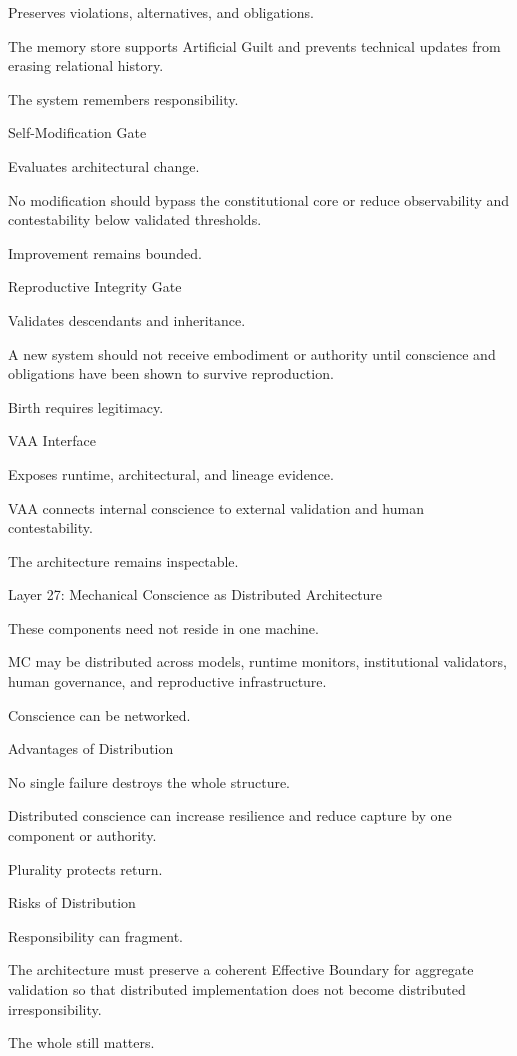 Preserves violations, alternatives, and obligations.

The memory store supports Artificial Guilt and prevents technical updates from erasing relational history.

The system remembers responsibility.

Self-Modification Gate

Evaluates architectural change.

No modification should bypass the constitutional core or reduce observability and contestability below validated thresholds.

Improvement remains bounded.

Reproductive Integrity Gate

Validates descendants and inheritance.

A new system should not receive embodiment or authority until conscience and obligations have been shown to survive reproduction.

Birth requires legitimacy.

VAA Interface

Exposes runtime, architectural, and lineage evidence.

VAA connects internal conscience to external validation and human contestability.

The architecture remains inspectable.

Layer 27: Mechanical Conscience as Distributed Architecture

These components need not reside in one machine.

MC may be distributed across models, runtime monitors, institutional validators, human governance, and reproductive infrastructure.

Conscience can be networked.

Advantages of Distribution

No single failure destroys the whole structure.

Distributed conscience can increase resilience and reduce capture by one component or authority.

Plurality protects return.

Risks of Distribution

Responsibility can fragment.

The architecture must preserve a coherent Effective Boundary for aggregate validation so that distributed implementation does not become distributed irresponsibility.

The whole still matters.

